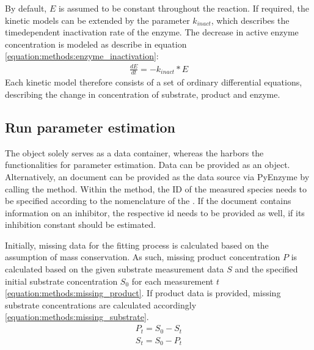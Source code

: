 \documentclass[letterpaper,12pt,english]{jupyterBook}
\begin{document}
\sphinxAtStartPar
By default, \(E\) is assumed to be constant throughout the reaction. If required, the kinetic models can be extended by the parameter \(k_{inact}\), which describes the time\sphinxhyphen{}dependent inactivation rate of the enzyme. The decrease in active enzyme concentration is modeled as describe in equation \eqref{equation:methods:enzyme_inactivation}:
\begin{equation}\label{equation:methods:enzyme_inactivation}
\begin{split}\frac{dE}{dt} = -k_{inact} * E\end{split}
\end{equation}
\sphinxAtStartPar
Each kinetic model therefore consists of a set of ordinary differential equations, describing the change in concentration of substrate, product and enzyme.


\subsection{Run parameter estimation}
\label{\detokenize{methods:run-parameter-estimation}}
\sphinxAtStartPar
{}

The  object solely serves as a data container, whereas
the  harbors the functionalities for parameter estimation. Data can be provided as an  object. Alternatively, an  document can be provided as the data source via PyEnzyme by calling the  method. Within the method, the ID of the measured species needs to be specified according to the nomenclature of the . If the document contains information on an inhibitor, the respective id needs to be provided as well, if its inhibition constant should be estimated.

\sphinxAtStartPar
Initially, missing data for the fitting process is calculated based on the assumption of mass conservation. As such, missing product concentration \(P\) is calculated based on the given substrate measurement data \(S\) and the specified initial substrate concentration \(S_{0}\) for each measurement \(t\) \eqref{equation:methods:missing_product}. If product data is provided, missing substrate concentrations are calculated accordingly \eqref{equation:methods:missing_substrate}.
\begin{equation}\label{equation:methods:missing_product}
\begin{split}P_{t} = S_{0} - S_{t}\end{split}
\end{equation}\begin{equation}\label{equation:methods:missing_substrate}
\begin{split}S_{t} = S_{0} - P_{t}\end{split}
\end{equation}
\sphinxAtStartPar
{}
\end{document}
